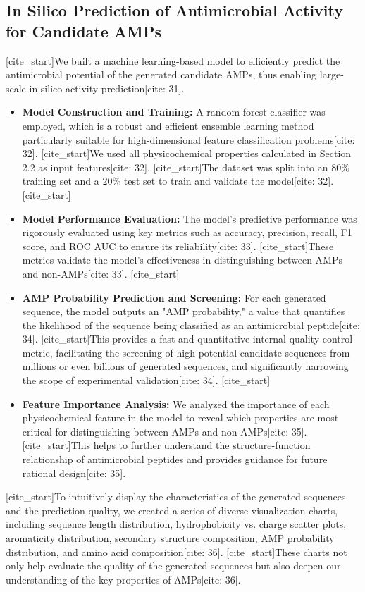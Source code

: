 \documentclass{article}
\begin{document}
\subsection{In Silico Prediction of Antimicrobial Activity for Candidate AMPs}
[cite_start]We built a machine learning-based model to efficiently predict the antimicrobial potential of the generated candidate AMPs, thus enabling large-scale in silico activity prediction[cite: 31].
\begin{itemize}
    [cite_start]\item \textbf{Model Construction and Training:} A random forest classifier was employed, which is a robust and efficient ensemble learning method particularly suitable for high-dimensional feature classification problems[cite: 32]. [cite_start]We used all physicochemical properties calculated in Section 2.2 as input features[cite: 32]. [cite_start]The dataset was split into an 80\% training set and a 20\% test set to train and validate the model[cite: 32].
    [cite_start]\item \textbf{Model Performance Evaluation:} The model's predictive performance was rigorously evaluated using key metrics such as accuracy, precision, recall, F1 score, and ROC AUC to ensure its reliability[cite: 33]. [cite_start]These metrics validate the model's effectiveness in distinguishing between AMPs and non-AMPs[cite: 33].
    [cite_start]\item \textbf{AMP Probability Prediction and Screening:} For each generated sequence, the model outputs an "AMP probability," a value that quantifies the likelihood of the sequence being classified as an antimicrobial peptide[cite: 34]. [cite_start]This provides a fast and quantitative internal quality control metric, facilitating the screening of high-potential candidate sequences from millions or even billions of generated sequences, and significantly narrowing the scope of experimental validation[cite: 34].
    [cite_start]\item \textbf{Feature Importance Analysis:} We analyzed the importance of each physicochemical feature in the model to reveal which properties are most critical for distinguishing between AMPs and non-AMPs[cite: 35]. [cite_start]This helps to further understand the structure-function relationship of antimicrobial peptides and provides guidance for future rational design[cite: 35].
\end{itemize}
[cite_start]To intuitively display the characteristics of the generated sequences and the prediction quality, we created a series of diverse visualization charts, including sequence length distribution, hydrophobicity vs. charge scatter plots, aromaticity distribution, secondary structure composition, AMP probability distribution, and amino acid composition[cite: 36]. [cite_start]These charts not only help evaluate the quality of the generated sequences but also deepen our understanding of the key properties of AMPs[cite: 36].
\end{document}
